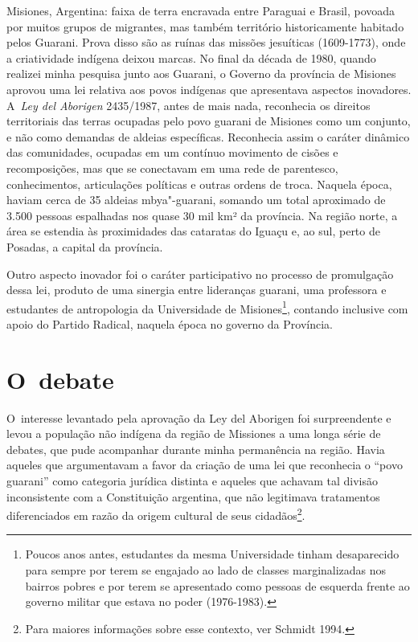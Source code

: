 Misiones, Argentina: faixa de terra encravada entre Paraguai e Brasil,
povoada por muitos grupos de migrantes, mas também território
historicamente habitado pelos Guarani. Prova disso são as ruínas das
missões jesuíticas (1609-1773), onde a criatividade indígena deixou
marcas. No final da década de 1980, quando realizei minha pesquisa
junto aos Guarani, o Governo da província de Misiones aprovou uma lei
relativa aos povos indígenas que apresentava aspectos inovadores. A~\emph{Ley
del Aborigen} 2435/1987, antes de mais nada, reconhecia os direitos
territoriais das terras ocupadas pelo povo guarani de Misiones como um
conjunto, e não como demandas de aldeias específicas. Reconhecia assim
o caráter dinâmico das comunidades, ocupadas em um contínuo movimento
de cisões e recomposições, mas que se conectavam em uma rede de
parentesco, conhecimentos, articulações políticas e outras ordens de
troca. Naquela época, haviam cerca de 35 aldeias mbya"-guarani, somando
um total aproximado de 3.500 pessoas espalhadas nos quase 30 mil km² da
província. Na região norte, a área se estendia às proximidades das
cataratas do Iguaçu e, ao sul, perto de Posadas, a capital da
província.

Outro aspecto inovador foi o caráter participativo no processo de
promulgação dessa lei, produto de uma sinergia entre lideranças
guarani, uma professora e estudantes de antropologia da Universidade de
Misiones\footnote{Poucos anos antes, estudantes da mesma Universidade
tinham desaparecido para sempre por terem se engajado ao lado de
classes marginalizadas nos bairros pobres e por terem se apresentado
como pessoas de esquerda frente ao governo militar que estava no poder
(1976-1983).}, contando inclusive com apoio do Partido Radical, naquela
época no governo da Província. 

\section{O~debate}

O~interesse levantado pela aprovação da Ley del Aborigen foi
surpreendente e levou a população não indígena da região de Missiones a
uma longa série de debates, que pude acompanhar durante minha
permanência na região. Havia aqueles que argumentavam a favor da
criação de uma lei que reconhecia o ``povo guarani'' como categoria
jurídica distinta e aqueles que achavam tal divisão inconsistente com a
Constituição argentina, que não legitimava tratamentos diferenciados em
razão da origem cultural de seus cidadãos\footnote{Para maiores
informações sobre esse contexto, ver Schmidt 1994.}. 

